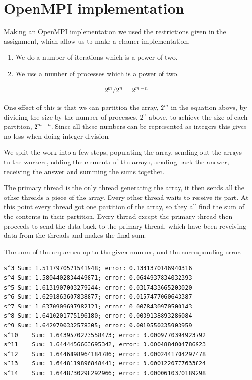 \section{OpenMPI implementation }
Making an OpenMPI implementation we used the restrictions given in the assignment, which allow us to make a cleaner implementation. 

\begin{enumerate}

\item We do a number of iterations which is a power of two. 

\item We use a number of processes which is a power of two. 

\end{enumerate}

\begin{align}
2^{m}/2^{n} = 2^{m-n}
\end{align}

One effect of this is that we can partition the array, $2^{m}$ in the equation above, by dividing the size by the number of processes, $2^{n}$ above, to achieve the size of each partition, $2^{m-n}$. 
Since all these numbers can be represented as integers this gives no loss when doing integer division. 

We split the work into a few steps, populating the array, sending out the arrays to the workers, adding the elements of the arrays, sending back the answer, receiving the answer and summing the sums together. 

The primary thread is the only thread generating the array, it then sends all the other threads a piece of the array. 
Every other thread waits to receive its part. 
At this point every thread got one partition of the array, so they all find the sum of the contents in their partition. 
Every thread except the primary thread then proceeds to send the data back to the primary thread, which have been reveiving data from the threads and makes the final sum. 

The sum of the sequenses up to the given number, and the corresponding error.
\begin{verbatim}
s^3	Sum: 1.5117970521541948; error: 0.1331370146940316
s^4	Sum: 1.5804402834449871; error: 0.0644937834032393
s^5	Sum: 1.6131907003279244; error: 0.0317433665203020
s^6	Sum: 1.6291863607838877; error: 0.0157477060643387
s^7	Sum: 1.6370909697982121; error: 0.0078430970500143
s^8	Sum: 1.6410201775196180; error: 0.0039138893286084
s^9	Sum: 1.6429790332578305; error: 0.0019550335903959
s^10	Sum: 1.6439570273558473; error: 0.0009770394923792
s^11	Sum: 1.6444456663695342; error: 0.0004884004786923
s^12	Sum: 1.6446898964184786; error: 0.0002441704297478
s^13	Sum: 1.6448119890848441; error: 0.0001220777633824
s^14	Sum: 1.6448730298292966; error: 0.0000610370189298
\end{verbatim}

